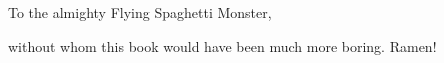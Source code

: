 
\renewenvironment{remark}{\begin{kframeRemark}\textit{Remark}.}{\end{kframeRemark}}
\thispagestyle{empty}

\begin{center}
To the almighty Flying Spaghetti Monster,

without whom this book would have been much more boring. Ramen!
\end{center}


